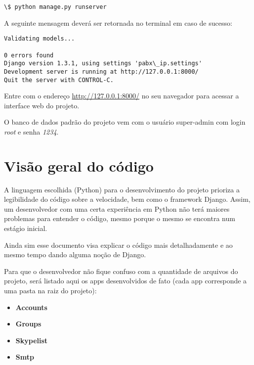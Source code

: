 \documentclass[letterpaper,10pt,brazil]{sphinxmanual}
\begin{document}
\begin{Verbatim}[commandchars=\\\{\}]
\$ python manage.py runserver
\end{Verbatim}

A seguinte mensagem deverá ser retornada no terminal em caso de sucesso:

\begin{Verbatim}[commandchars=\\\{\}]
Validating models...

0 errors found
Django version 1.3.1, using settings 'pabx\_ip.settings'
Development server is running at http://127.0.0.1:8000/
Quit the server with CONTROL-C.
\end{Verbatim}

Entre com o endereço \href{http://127.0.0.1:8000/}{http://127.0.0.1:8000/} no seu navegador para acessar a interface web do projeto.

O banco de dados padrão do projeto vem com o usuário super-admin com login \emph{root} e senha \emph{1234}.


\section{Visão geral do código}
\label{codigo::doc}\label{codigo:visao-geral-do-codigo}
A linguagem escolhida (Python) para o desenvolvimento do projeto prioriza a legibilidade do código sobre a velocidade, bem como o framework Django. Assim, um desenvolvedor com uma certa experiência em Python não terá maiores problemas para entender o código, mesmo porque o mesmo se encontra num estágio inicial.

Ainda sim esse documento visa explicar o código mais detalhadamente e ao mesmo tempo dando alguma noção de Django.

Para que o desenvolvedor não fique confuso com a quantidade de arquivos do projeto, será listado aqui os apps desenvolvidos de fato (cada app corresponde a uma pasta na raiz do projeto):
\begin{itemize}
\item {} 
\textbf{Accounts}

\item {} 
\textbf{Groups}

\item {} 
\textbf{Skypelist}

\item {} 
\textbf{Smtp}

\end{itemize}
\end{document}
